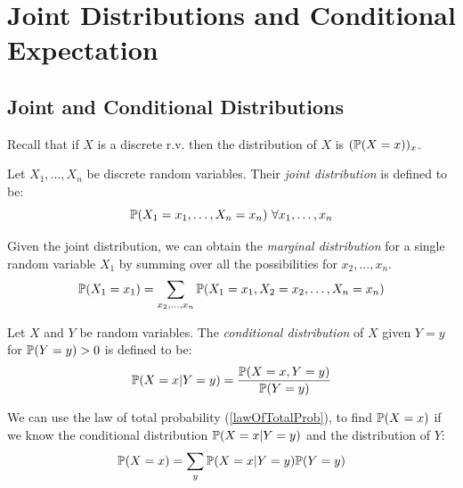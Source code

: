 \documentclass[../main.tex]{subfiles}
\begin{document}
\section{Joint Distributions and Conditional Expectation}
\subsection{Joint and Conditional Distributions}
\label{jointConditionalDiscrete}
\begin{remark}[Recap]
  Recall that if $X$ is a discrete r.v. then the distribution of $X$ is $(\P(X = x))_x$.
\end{remark}
\begin{definition}
  Let $X_1, \ldots, X_n$ be discrete random variables.
  Their \textit{joint distribution} is defined to be:
  \[
    \P(X_1 = x_1, \ldots, X_n = x_n)\ \forall x_1, \ldots, x_n
  \]
\end{definition}
\begin{definition}
  Given the joint distribution, we can obtain the \textit{marginal distribution} for a single random variable $X_1$ by summing over all the possibilities for $x_2, \ldots, x_n$.
  \[
    \P(X_1 = x_1) = \sum_{x_2, \ldots, x_n} \P(X_1 = x_1, X_2 = x_2, \ldots, X_n = x_n)
  \]
\end{definition}
\begin{definition}
  Let $X$ and $Y$ be random variables.
  The \textit{conditional distribution} of $X$ given $Y = y$ for $\P(Y = y) > 0$ is defined to be:
  \[
    \P(X = x \vert Y = y) = \frac{\P(X = x, Y = y)}{\P(Y = y)}
  \]
\end{definition}
We can use the law of total probability (\cref{lawOfTotalProb}), to find $\P(X = x)$ if we know the conditional distribution $\P(X = x \vert Y = y)$ and the distribution of $Y$:
\[
  \P(X = x) = \sum_{y} \P(X = x \vert Y = y) \P(Y = y)
\]
\end{document}
